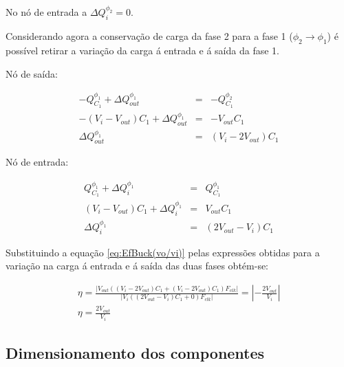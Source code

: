 \documentclass[12pt]{article}
\begin{document}
   No nó de entrada a $\Delta Q^{\phi_2}_{i} = 0$.
   \vspace{5mm}
   
   Considerando agora a conservação de carga da fase 2 para a fase 1 ($\phi_2 \rightarrow \phi_1$) é possível retirar a variação da carga á entrada e á saída da fase 1.
   \vspace{5mm}

Nó de saída:

{\footnotesize \begin{equation}  
\label{eq:Variao1s}
\begin{array}{ccc}
   - Q^{\phi_1}_{C_1} + \Delta Q^{\phi_1}_{out} &=& -Q^{\phi_2}_{C_1}\\  [1em]        
   -(V_i-V_{out})C_1+\Delta Q^{\phi_1}_{out} &=& -V_{out}C_1 \\[1em]
    \Delta Q^{\phi_1}_{out} &=& (V_i - 2V_{out})C_1
  \end{array}
  \end{equation}}
  \vspace{5mm}

Nó de entrada:

{\footnotesize \begin{equation} 
\label{eq:Variao1i}
\begin{array}{ccc}
   Q^{\phi_1}_{C_1} + \Delta Q^{\phi_1}_{i} &=& Q^{\phi_1}_{C_1}\\  [1em]        
   (V_i-V_{out})C_1+\Delta Q^{\phi_1}_{i} &=& V_{out}C_1 \\[1em]
    \Delta Q^{\phi_1}_{i} &=& ( 2V_{out}-V_i)C_1
  \end{array}
  \end{equation}}
  \vspace{5mm}

Substituindo a equação \ref{eq:EfBuck(vo/vi)} pelas expressões obtidas para a variação na carga á entrada e á saída das duas fases obtém-se:

{\footnotesize \begin{equation}
\label{eq:EfBuck(vo/vi)_final}
\begin{array}{cc}
\eta = \frac{|V_{out}((V_i - 2V_{out})C_1 + (V_i - 2V_{out})C_1  )F_{clk}|}{{|V_i(( 2V_{out}-V_i)C_1 + 0)F_{clk}|}} = |-\frac{2V_{out}}{V_i}|\\ [1em]
\eta =\frac{2V_{out}}{V_i}
\end{array}
\end{equation}}
\subsection{Dimensionamento dos componentes}
\end{document}
